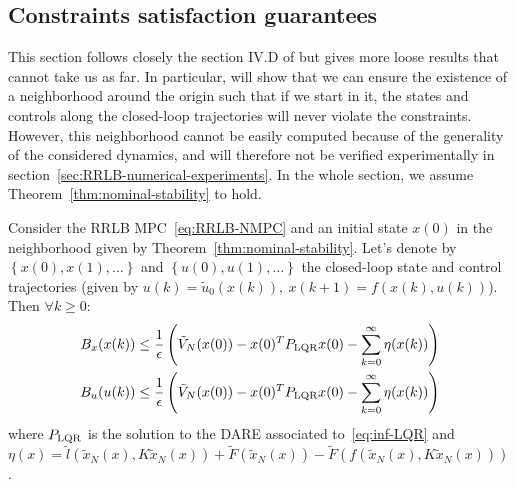 \documentclass[12pt]{article}
\begin{document}
\subsection{Constraints satisfaction guarantees}\label{sec:constraints-satisfaction-guarantees}
This section follows closely the section IV.D of \cite{RRLB-linear-MPC} but gives more loose results that cannot take us as far.
In particular, will show that we can ensure the existence of a neighborhood around the origin such that if we start in it, the states and controls along the closed-loop trajectories will never violate the constraints.
However, this neighborhood cannot be easily computed because of the generality of the considered dynamics, and will therefore not be verified experimentally in section~\ref{sec:RRLB-numerical-experiments}.
In the whole section, we assume Theorem~\ref{thm:nominal-stability} to hold.

\begin{lemma}
	\label{thm:RRLB-bounds-guarantees}
	Consider the RRLB MPC~\ref{eq:RRLB-NMPC} and an initial state $x(0)$ in the neighborhood given by Theorem~\ref{thm:nominal-stability}.
	Let's denote by $\left\{x(0),x(1),\ldots\right\}$ and $\left\{u(0), u(1),\ldots\right\}$ the closed-loop state and control trajectories (given by $u(k)=\tilde{u}_0(x(k)),~x(k+1)=f(x(k),u(k))$).
	Then $\forall k\geq 0$:
	\begin{align*}
		B_x(x(k))&\leq\frac{1}{\epsilon}\left(\tilde{V}_N(x(0))-x(0)^TP_{\rm{LQR}}x(0)-\sum_{k=0}^\infty\eta(x(k))\right)\\
		B_u(u(k))&\leq\frac{1}{\epsilon}\left(\tilde{V}_N(x(0))-x(0)^TP_{\rm{LQR}}x(0)-\sum_{k=0}^\infty\eta(x(k))\right)
	\end{align*}
	where $P_{\rm{LQR}}$ is the solution to the DARE associated to~\ref{eq:inf-LQR} and $\eta(x)=\tilde{l}(\tilde{x}_N(x),K\tilde{x}_N(x))+\tilde{F}(\tilde{x}_N(x))-\tilde{F}(f(\tilde{x}_N(x), K\tilde{x}_N(x)))$.
\end{lemma}
\end{document}
